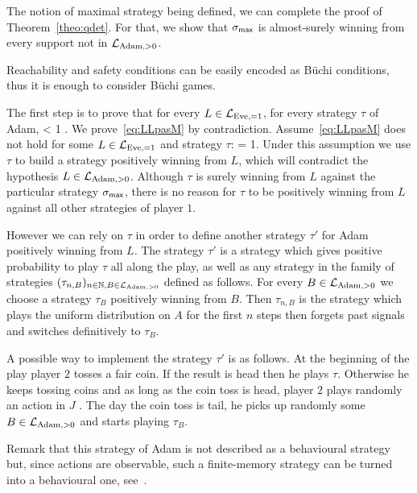 \medskip 

The notion of maximal strategy being defined,
we can complete the proof of Theorem~\ref{theo:qdet}.
For that, we show that
$\sigma_{\textsf{max}}$
is almost-surely
winning from every support not in $\mathcal{L}_{\text{Adam},>0}$.



Reachability and safety conditions can be easily encoded as B{\"u}chi conditions,
thus it is enough to consider  B{\"u}chi games.



The first step is to prove that for every $L\in\mathcal{L}_{\text{Eve},=1}$,
for every strategy $\tau$ of Adam,
\be\label{eq:LLpasM}
 < 1 \enspace.
\ee
We prove~\eqref{eq:LLpasM} by contradiction.
Assume~\eqref{eq:LLpasM} does not hold for some $L\in \mathcal{L}_{\text{Eve},=1}$
and strategy $\tau$:
\be\label{eq:winsafe}
 = 1\enspace.
\ee
Under this assumption we use $\tau$ to build a strategy positively winning from $L$,
which will contradict the hypothesis 
$L\in\mathcal{L}_{\text{Adam},>0}$.
Although $\tau$ is surely winning from $L$ against the particular strategy $\sigma_{\textsf{max}}$,
there is no reason for $\tau$ to be positively winning from $L$
against all other strategies of player $1$.
{
However we can rely on $\tau$
in order to define another strategy 
$\tau'$ for Adam positively winning from $L$.
The strategy $\tau'$ is a strategy
which gives positive probability to play $\tau$
all along the play,
as well as any strategy in the family
of strategies
$(\tau_{n,B})_{n\in\mathbb{N},B\in \mathcal{L}_{\text{Adam},>0}}$ defined as follows.
For every $B\in\mathcal{L}_{\text{Adam},>0}$ we choose a strategy $\tau_B$ positively winning from $B$.
Then
$\tau_{n,B}$ is the strategy which plays 
the uniform distribution on $A$ for the first $n$ steps then forgets past signals and switches definitively to $\tau_B$. 

A possible way to implement the  strategy $\tau'$
is as follows.
At the beginning of the play
player $2$ tosses a fair coin. If the result is head then he plays $\tau$. Otherwise he keeps 
tossing coins and as long as the coin toss is head, player $2$ plays randomly an action in $J$ .
The day the coin toss is tail, he picks up randomly some $B\in\mathcal{L}_{\text{Adam},>0}$ and starts playing $\tau_B$.
}
Remark that this strategy of Adam is not described as a behavioural strategy
but, since actions are observable,
such a finite-memory strategy can be turned into a behavioural one,
see~\cite[Lemma 4.6 and 4.7]{BGGjacm}.



